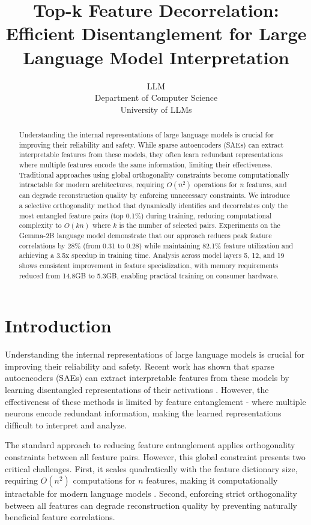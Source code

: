\documentclass{article} %
\title{Top-k Feature Decorrelation: Efficient Disentanglement for Large Language Model Interpretation}
\author{LLM\\
Department of Computer Science\\
University of LLMs\\
}
\begin{document}
\maketitle

\begin{abstract}
Understanding the internal representations of large language models is crucial for improving their reliability and safety. While sparse autoencoders (SAEs) can extract interpretable features from these models, they often learn redundant representations where multiple features encode the same information, limiting their effectiveness. Traditional approaches using global orthogonality constraints become computationally intractable for modern architectures, requiring $O(n^2)$ operations for $n$ features, and can degrade reconstruction quality by enforcing unnecessary constraints. We introduce a selective orthogonality method that dynamically identifies and decorrelates only the most entangled feature pairs (top 0.1\%) during training, reducing computational complexity to $O(kn)$ where $k$ is the number of selected pairs. Experiments on the Gemma-2B language model demonstrate that our approach reduces peak feature correlations by 28\% (from 0.31 to 0.28) while maintaining 82.1\% feature utilization and achieving a 3.5x speedup in training time. Analysis across model layers 5, 12, and 19 shows consistent improvement in feature specialization, with memory requirements reduced from 14.8GB to 5.3GB, enabling practical training on consumer hardware.
\end{abstract}

\section{Introduction}
\label{sec:intro}

Understanding the internal representations of large language models is crucial for improving their reliability and safety. Recent work has shown that sparse autoencoders (SAEs) can extract interpretable features from these models by learning disentangled representations of their activations \cite{goodfellow2016deep}. However, the effectiveness of these methods is limited by feature entanglement - where multiple neurons encode redundant information, making the learned representations difficult to interpret and analyze.

The standard approach to reducing feature entanglement applies orthogonality constraints between all feature pairs. However, this global constraint presents two critical challenges. First, it scales quadratically with the feature dictionary size, requiring $O(n^2)$ computations for $n$ features, making it computationally intractable for modern language models \cite{vaswani2017attention}. Second, enforcing strict orthogonality between all features can degrade reconstruction quality by preventing naturally beneficial feature correlations.
\end{document}
